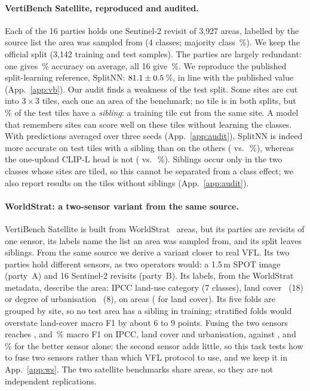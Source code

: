 \paragraph{VertiBench Satellite, reproduced and audited.}\label{sec:vb-audit}
Each of the 16 parties holds one Sentinel-2 revisit of 3{,}927 areas, labelled by the source list the area was sampled from (4 classes; majority class \majVB\,\%). We keep the official split (3{,}142 training and \giVbNTest{} test samples). The parties are largely redundant: one gives \soloMean\,\% accuracy on average, all 16 give \partiesKAll\,\%. We reproduce the published split-learning reference, SplitNN: $81.1\pm0.5$\,\%, in line with the published value (App.~\ref{app:vb}). Our audit finds a weakness of the test split. Some sites are cut into $3\times3$ tiles, each one an area of the benchmark; no tile is in both splits, but \auSibShare\,\% of the test tiles have a \emph{sibling}: a training tile cut from the same site. A model that remembers sites can score well on these tiles without learning the classes. With predictions averaged over three seeds (App.~\ref{app:audit}), SplitNN is indeed more accurate on test tiles with a sibling than on the others (\auSnSib{} vs.\ \auSnNoSib\,\%), whereas the one-upload CLIP-L head is not (\auClipSib{} vs.\ \auClipNoSib\,\%). Siblings occur only in the two classes whose sites are tiled, so this cannot be separated from a class effect; we also report results on the tiles without siblings (App.~\ref{app:audit}).

\paragraph{WorldStrat: a two-sensor variant from the same source.}
VertiBench Satellite is built from WorldStrat~\cite{cornebise2022worldstrat} areas, but its parties are revisits of one sensor, its labels name the list an area was sampled from, and its split leaves siblings. From the same source we derive a variant closer to real VFL. Its two parties hold different sensors, as two operators would: a 1.5\,m SPOT image (party~A) and 16 Sentinel-2 revisits (party~B). Its labels, from the WorldStrat metadata, describe the area: IPCC land-use category (7 classes), land cover~\cite{esa2017cci} (18) or degree of urbanisation~\cite{pesaresi2019ghsl} (8), on \wsIpccN{} areas (\wsLccsN{} for land cover). Its five folds are grouped by site, so no test area has a sibling in training; stratified folds would overstate land-cover macro F1 by about 6 to 9 points. Fusing the two sensors reaches \wsIpccFus, \wsLccsFus{} and \wsSmodFus\,\% macro F1 on IPCC, land cover and urbanisation, against \wsIpccSms, \wsLccsSms{} and \wsSmodSpot\,\% for the better sensor alone: the second sensor adds little, so this task tests how to fuse two sensors rather than which VFL protocol to use, and we keep it in App.~\ref{app:ws}. The two satellite benchmarks share areas, so they are not independent replications.

